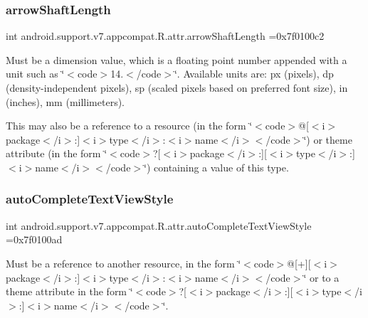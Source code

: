 \subsubsection{\texorpdfstring{arrow\+Shaft\+Length}{arrowShaftLength}}
{\footnotesize\ttfamily int android.\+support.\+v7.\+appcompat.\+R.\+attr.\+arrow\+Shaft\+Length =0x7f0100c2\hspace{0.3cm}{\ttfamily [static]}}

Must be a dimension value, which is a floating point number appended with a unit such as \char`\"{}$<$code$>$14.\+5sp$<$/code$>$\char`\"{}. Available units are\+: px (pixels), dp (density-\/independent pixels), sp (scaled pixels based on preferred font size), in (inches), mm (millimeters). 

This may also be a reference to a resource (in the form \char`\"{}$<$code$>$@\mbox{[}$<$i$>$package$<$/i$>$\+:\mbox{]}$<$i$>$type$<$/i$>$\+:$<$i$>$name$<$/i$>$$<$/code$>$\char`\"{}) or theme attribute (in the form \char`\"{}$<$code$>$?\mbox{[}$<$i$>$package$<$/i$>$\+:\mbox{]}\mbox{[}$<$i$>$type$<$/i$>$\+:\mbox{]}$<$i$>$name$<$/i$>$$<$/code$>$\char`\"{}) containing a value of this type. \mbox{\label{classandroid_1_1support_1_1v7_1_1appcompat_1_1R_1_1attr_a9c6adb855e4bb0ec184b8f3c903ac322}} 
\subsubsection{\texorpdfstring{auto\+Complete\+Text\+View\+Style}{autoCompleteTextViewStyle}}
{\footnotesize\ttfamily int android.\+support.\+v7.\+appcompat.\+R.\+attr.\+auto\+Complete\+Text\+View\+Style =0x7f0100ad\hspace{0.3cm}{\ttfamily [static]}}

Must be a reference to another resource, in the form \char`\"{}$<$code$>$@\mbox{[}+\mbox{]}\mbox{[}$<$i$>$package$<$/i$>$\+:\mbox{]}$<$i$>$type$<$/i$>$\+:$<$i$>$name$<$/i$>$$<$/code$>$\char`\"{} or to a theme attribute in the form \char`\"{}$<$code$>$?\mbox{[}$<$i$>$package$<$/i$>$\+:\mbox{]}\mbox{[}$<$i$>$type$<$/i$>$\+:\mbox{]}$<$i$>$name$<$/i$>$$<$/code$>$\char`\"{}. \mbox{\label{classandroid_1_1support_1_1v7_1_1appcompat_1_1R_1_1attr_a9b1855dc381ac6067c08e52a28f5c096}} 
